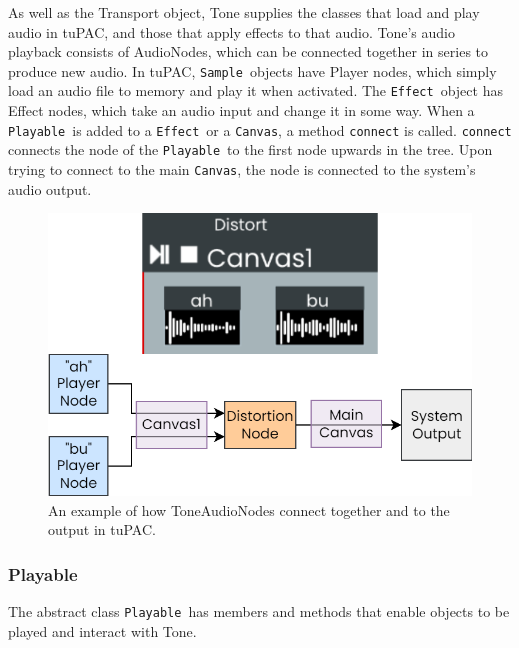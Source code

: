 \documentclass[12pt,a4paper,oneside,openright]{report}
\newcommand{\canvas}{\texttt{Canvas}}
\newcommand{\playable}{\texttt{Playable}}
\newcommand{\sample}{\texttt{Sample}}
\newcommand{\effect}{\texttt{Effect}}
\begin{document}
As well as the Transport object, Tone supplies the classes that load and play audio in tuPAC, and those that apply effects to that audio. Tone's audio playback consists of AudioNodes, which can be connected together in series to produce new audio. In tuPAC, \sample\ objects have Player nodes, which simply load an audio file to memory and play it when activated. The \effect\ object has Effect nodes, which take an audio input and change it in some way. When a \playable\ is added to a \effect\ or a \canvas, a method \verb|connect| is called. \verb|connect| connects the node of the \playable\ to the first node upwards in the tree. Upon trying to connect to the main \canvas, the node is connected to the system's audio output.

\begin{figure}[h]
    \centering
    \includegraphics[scale=0.5]{images/node_diagram.png}
    \caption{An example of how ToneAudioNodes connect together and to the output in tuPAC.}
    \label{fig:node_diagram}
\end{figure}

\subsubsection{Playable}
The abstract class \playable\ has members and methods that enable objects to be played and interact with Tone. 
\end{document}
